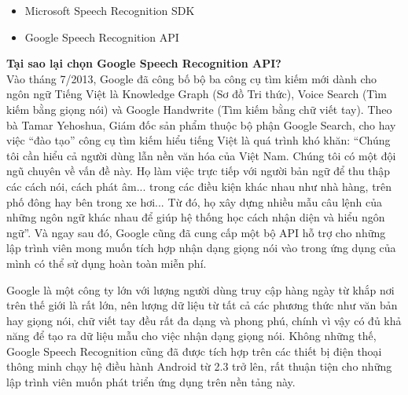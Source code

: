 \documentclass[12pt]{report}
\begin{document}
\begin{itemize}
	\item Microsoft Speech Recognition SDK
	\item Google Speech Recognition API
\end{itemize}
\noindent \textbf{Tại sao lại chọn Google Speech Recognition API?}\\[0.3cm]
\noindent Vào tháng 7/2013, Google đã công bố bộ ba công cụ tìm kiếm mới dành cho ngôn ngữ Tiếng Việt là Knowledge Graph (Sơ đồ Tri thức), Voice Search (Tìm kiếm bằng giọng nói) và Google Handwrite (Tìm kiếm bằng chữ viết tay). Theo bà Tamar Yehoshua, Giám đốc sản phẩm thuộc bộ phận Google Search, cho hay việc ``đào tạo'' công cụ tìm kiếm hiểu tiếng Việt là quá trình khó khăn: ``Chúng tôi cần hiểu cả người dùng lẫn nền văn hóa của Việt Nam. Chúng tôi có một đội ngũ chuyên về vấn đề này. Họ làm việc trực tiếp với người bản ngữ để thu thập các cách nói, cách phát âm... trong các điều kiện khác nhau như nhà hàng, trên phố đông hay bên trong xe hơi... Từ đó, họ xây dựng nhiều mẫu câu lệnh của những ngôn ngữ khác nhau để giúp hệ thống học cách nhận diện và hiểu ngôn ngữ''\cite{google-vietnamese}. Và ngay sau đó, Google cũng đã cung cấp một bộ API hỗ trợ cho những lập trình viên mong muốn tích hợp nhận dạng giọng nói vào trong ứng dụng của mình có thể sử dụng hoàn toàn miễn phí.

Google là một công ty lớn với lượng người dùng truy cập hàng ngày từ khắp nơi trên thế giới là rất lớn, nên lượng dữ liệu từ tất cả các phương thức như văn bản hay giọng nói, chữ viết tay đều rất đa dạng và phong phú, chính vì vậy có đủ khả năng để tạo ra dữ liệu mẫu cho việc nhận dạng giọng nói. Không những thế, Google Speech Recognition cũng đã được tích hợp trên các thiết bị điện thoại thông minh chạy hệ điều hành Android từ 2.3 trở lên, rất thuận tiện cho những lập trình viên muốn phát triển ứng dụng trên nền tảng này.
\end{document}

